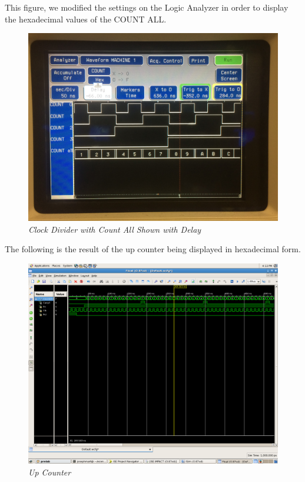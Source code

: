 \documentclass[a4paper,12pt]{article}
\begin{document}
  This figure, we modified the settings on the Logic Analyzer in order to display the hexadecimal values of the COUNT ALL.
  
  \begin{figure}[h]
    \begin{center}
      \includegraphics[scale=.08]{IMG_8622.JPG}
      \caption{\textit{Clock Divider with Count All Shown with Delay}}
    \end{center}
  \end{figure}
  
  The following is the result of the up counter being displayed in hexadecimal form.
  
  \begin{figure}[h]
    \begin{center}
      \includegraphics[scale=.18]{2_2_e.png}
      \caption{\textit{Up Counter}}
    \end{center}
  \end{figure}
\end{document}
